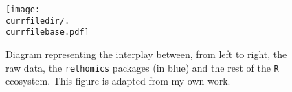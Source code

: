 \begin{figure}[h!]
  \centering   
   \texttt{[image: \\currfiledir/.\\currfilebase.pdf]}
  \caption[The rethomics workflow]{
  		Diagram representing the interplay between, from left to right, the raw data, the \texttt{rethomics} packages (in blue) and the rest of the \texttt{R} ecosystem.
		This figure is adapted from my own work\cite{geissmann_rethomics_2018}.
  	\label{fig:\currfilebase}
  }
\end{figure}





